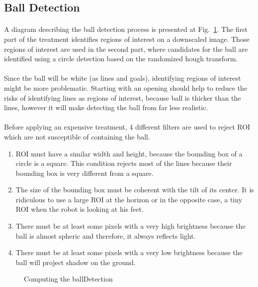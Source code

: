 \documentclass[a4paper,12pt]{article}
\begin{document}
\subsection{Ball Detection}
\paragraph{}
A diagram describing the ball detection process is presented at
Fig.~\ref{fig:ballDetection}. The first part of the treatment identifies
regions of interest on a downscaled image. Those regions of interest are used
in the second part, where candidates for the ball are identified using a circle
detection based on the randomized hough transform.
\paragraph{}
Since the ball will be white (as lines and goals), identifying regions of
interest might be more problematic. Starting with an opening should help to
reduce the risks of identifying lines as regions of interest, because ball is
thicker than the lines, however it will make detecting the ball from far less
realistic.
\paragraph{}
Before applying an expensive treatment, 4 different filters are used to reject 
ROI which are not susceptible of containing the ball.
\begin{enumerate}
\item ROI must have a similar width and height, because the bounding box of a
  circle is a square. This condition rejects most of the lines because their
  bounding box is very different from a square.
\item The size of the bounding box must be coherent with the tilt of its center.
  It is ridiculous to use a large ROI at the horizon or in the opposite case, a
  tiny ROI when the robot is looking at his feet.
\item There must be at least some pixels with a very high brightness because the
  ball is almost spheric and therefore, it always reflects light.
\item There must be at least some pixels with a very low brightness because the
  ball will project shadow on the ground.
\end{enumerate}


\begin{figure}
  \centering
  \caption{\label{fig:ballDetection}Computing the ballDetection}
  
\end{figure}
\end{document}
